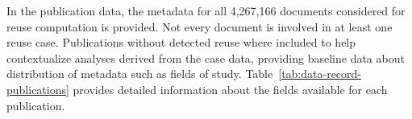 In the publication data, the metadata for all 4,267,166 documents considered for reuse computation is provided. Not every document is involved in at least one reuse case. Publications without detected reuse where included to help contextualize analyses derived from the case data, providing baseline data about distribution of metadata such as fields of study. Table~\ref{tab:data-record-publications} provides detailed information about the fields available for each publication. 

